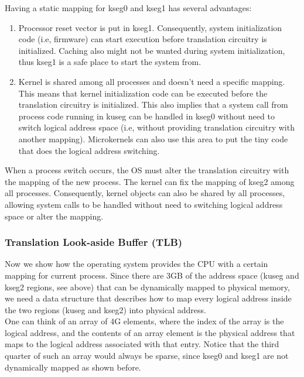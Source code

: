 \documentclass[oneside]{book}
\begin{document}
Having a static mapping for kseg0 and kseg1 has several advantages:

\begin{enumerate}

\item Processor reset vector is put in kseg1. Consequently, system
      initialization code (i.e, firmware) can start execution
      before translation circuitry is initialized. Caching also
      might not be wanted during system initialization, thus
      kseg1 is a safe place to start the system from.

\item Kernel is shared among all processes and doesn't need a specific
      mapping. This means that kernel initialization code can be
      executed before the translation circuitry is initialized. This
      also implies that a system call from process code running in
      kuseg can be handled in kseg0 without need to switch logical address
      space (i.e, without providing translation circuitry with another
      mapping). Microkernels can also use this area to put the tiny
      code that does the logical address switching.

\end{enumerate}

When a process switch occurs, the OS must alter the translation
circuitry with the mapping of the new process. The kernel
can fix the mapping of kseg2 among all processes. Consequently, kernel
objects can also be shared by all processes, allowing system calls
to be handled without need to switching logical address space
or alter the mapping.

\subsubsection{Translation Look-aside Buffer (TLB)}

Now we show how the operating system provides the CPU with a certain
mapping for current process. Since there are 3GB of the address
space (kuseg and kseg2 regions, see above) that can be dynamically
mapped to physical memory, we need a data structure that describes
how to map every logical address inside the two regions (kuseg and
kseg2) into physical address. \\

One can think of an array of 4G elements, where the index of the array
is the logical address, and the contents of an array element is
the physical address that maps to the logical address associated
with that entry. Notice that the third quarter of such an
array would always be sparse, since kseg0 and kseg1 are not dynamically
mapped as shown before. \\
\end{document}
